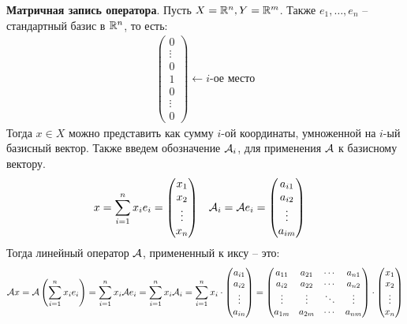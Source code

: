 \textbf{Матричная запись оператора}. Пусть $X = \mathbb{R}^n, Y = \mathbb{R}^m$. Также $e_1, \dots, e_n$ -- стандартный базис в $\mathbb{R}^n$, то есть:
\begin{gather*}
    \begin{pmatrix*}
        0 \\ 
        \vdots \\
        0 \\
        1 \\
        0 \\
        \vdots \\
        0
    \end{pmatrix*} \longleftarrow i\text{-ое место}
\end{gather*}
Тогда $x \in X$ можно представить как сумму $i$-ой координаты, умноженной на $i$-ый базисный вектор. 
Также введем обозначение $\mathcal{A}_i$, для применения $\mathcal{A}$ к базисному вектору. 
\begin{align*}
    x &= \sum\limits_{i=1}^n x_i e_i = \begin{pmatrix*}
        x_1 \\
        x_2 \\
        \vdots \\
        x_n
    \end{pmatrix*} & \A_i &= \A e_i = \begin{pmatrix*}
        a_{i1} \\
        a_{i2} \\
        \vdots \\
        a_{im}
    \end{pmatrix*}
\end{align*}
Тогда линейный оператор $\mathcal{A}$, примененный к иксу -- это:
\begin{gather*}
    \A x = \A \left( \sum\limits_{i=1}^n x_i e_i \right) = \sum\limits_{i=1}^n x_i \A e_i = \sum\limits_{i=1}^n x_i \A_i = \sum\limits_{i=1}^n x_i \cdot \begin{pmatrix*} 
        a_{i1} \\
        a_{i2} \\
        \vdots \\
        a_{in}
    \end{pmatrix*} =
    \begin{pmatrix*} 
        a_{11} & a_{21} & \cdots & a_{n1} \\
        a_{i2} & a_{22} & \cdots & a_{n2} \\
        \vdots & \vdots & \ddots & \vdots \\
        a_{1m} & a_{2m} & \cdots & a_{nm} 
    \end{pmatrix*} \cdot \begin{pmatrix*}
        x_1 \\
        x_2 \\
        \vdots \\
        x_n
    \end{pmatrix*}
\end{gather*}
